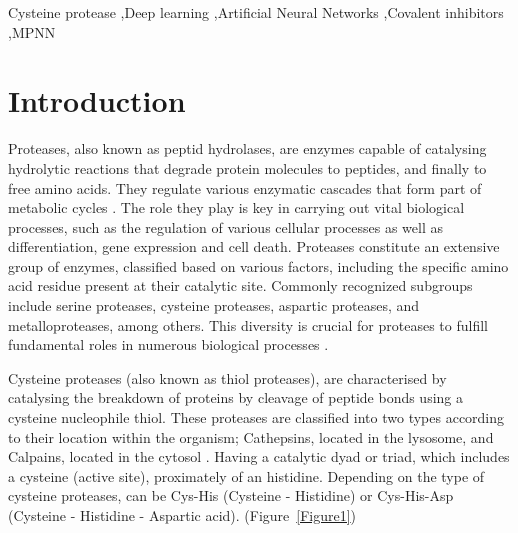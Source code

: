 \documentclass[final,times,twocolumn,article]{elsarticle}
\begin{document}
\begin{frontmatter}
\begin{abstract}
\end{abstract}



\begin{keyword}
Cysteine protease \sep Deep learning \sep Artificial Neural Networks \sep Covalent inhibitors \sep MPNN



\end{keyword}


\end{frontmatter}




\section{Introduction}

Proteases, also known as peptid hydrolases, are enzymes capable of catalysing hydrolytic reactions that degrade protein molecules to peptides, and finally to free amino acids. They regulate various enzymatic cascades that form part of metabolic cycles \cite{Ramos2019}. The role they play is key in carrying out vital biological processes, such as the regulation of various cellular processes as well as differentiation, gene expression and cell death. Proteases constitute an extensive group of enzymes, classified based on various factors, including the specific amino acid residue present at their catalytic site. Commonly recognized subgroups include serine proteases, cysteine proteases, aspartic proteases, and metalloproteases, among others. This diversity is crucial for proteases to fulfill fundamental roles in numerous biological processes \cite{Ramos2019}.

Cysteine proteases (also known as thiol proteases), are characterised by catalysing the breakdown of proteins by cleavage of peptide bonds using a cysteine nucleophile thiol. These proteases are classified into two types according to their location within the organism; Cathepsins, located in the lysosome, and Calpains, located in the cytosol \cite{Gupta2020}. Having a catalytic dyad or triad, which includes a cysteine (active site), proximately of an histidine. Depending on the type of cysteine proteases, can be Cys-His (Cysteine - Histidine) or Cys-His-Asp (Cysteine - Histidine - Aspartic acid)\cite{Nicholson2013}. (Figure~\ref{Figure1}) 
\end{document}
